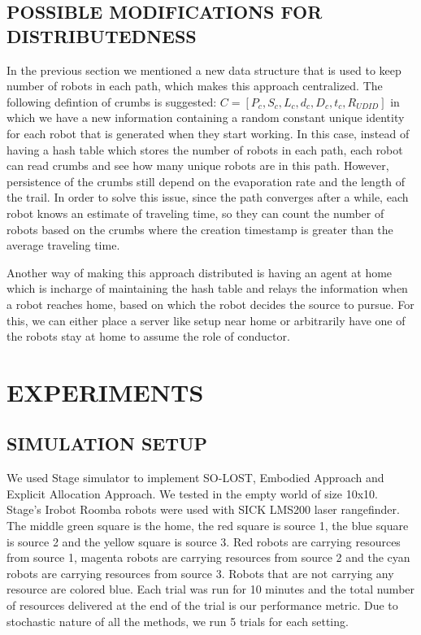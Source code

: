 \documentclass[letterpaper, 10 pt, conference]{ieeeconf}  %
\begin{document}
\subsection{POSSIBLE MODIFICATIONS FOR DISTRIBUTEDNESS}
In the previous section we mentioned a new data structure that is used to keep number of robots in each path, which makes this approach centralized. The following defintion of crumbs is suggested: $C = [P_c, S_c, L_c, d_c, D_c, t_c, R_{UDID}]$ in which we have a new information containing a random constant unique identity for each robot that is generated when they start working. In this case, instead of having a hash table which stores the number of robots in each path, each robot can read crumbs and see how many unique robots are in this path. However, persistence of the crumbs still depend on the evaporation rate and the length of the trail. In order to solve this issue, since the path converges after a while, each robot knows an estimate of traveling time, so they can count the number of robots based on the crumbs where the creation timestamp is greater than the average traveling time.

Another way of making this approach distributed is having an agent at home which is incharge of maintaining the hash table and relays the information when a robot reaches home, based on which the robot decides the source to pursue. For this, we can either place a server like setup near home or arbitrarily have one of the robots stay at home to assume the role of conductor.

\section{EXPERIMENTS} \label{section:experiments}

\subsection{SIMULATION SETUP}

We used Stage simulator \cite{STAGE} to implement SO-LOST, Embodied Approach and Explicit Allocation Approach. We tested in the empty world of size 10x10. Stage's Irobot Roomba robots were used with SICK LMS200 laser rangefinder. The middle green square is the home, the red square is source 1, the blue square is source 2 and the yellow square is source 3. Red robots are carrying resources from source 1, magenta robots are carrying resources from source 2 and the cyan robots are carrying resources from source 3. Robots that are not carrying any resource are colored blue. Each trial was run for 10 minutes and the total number of resources delivered at the end of the trial is our performance metric. Due to stochastic nature of all the methods, we run 5 trials for each setting.
\end{document}
